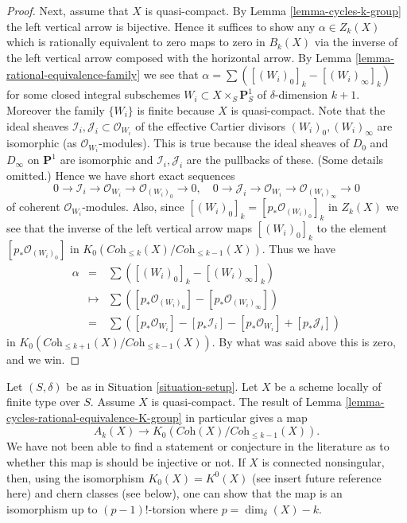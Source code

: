 \begin{proof}
\medskip\noindent
Next, assume that $X$ is quasi-compact. By Lemma \ref{lemma-cycles-k-group}
the left vertical arrow is bijective. Hence it suffices to show
any $\alpha \in Z_k(X)$ which is rationally equivalent to zero
maps to zero in $B_k(X)$ via the inverse of the left vertical
arrow composed with the horizontal arrow.
By Lemma \ref{lemma-rational-equivalence-family} we see that
$\alpha = \sum ([(W_i)_0]_k - [(W_i)_\infty]_k)$ for some
closed integral subschemes $W_i \subset X \times_S \mathbf{P}^1_S$
of $\delta$-dimension $k + 1$. Moreover the family
$\{W_i\}$ is finite because $X$ is quasi-compact.
Note that the ideal sheaves
$\mathcal{I}_i, \mathcal{J}_i \subset \mathcal{O}_{W_i}$
of the effective Cartier divisors $(W_i)_0, (W_i)_\infty$
are isomorphic (as $\mathcal{O}_{W_i}$-modules). This is true
because the ideal sheaves of $D_0$ and $D_\infty$ on $\mathbf{P}^1$
are isomorphic and $\mathcal{I}_i, \mathcal{J}_i$ are the pullbacks of
these. (Some details omitted.) Hence we have
short exact sequences
$$
0 \to \mathcal{I}_i \to \mathcal{O}_{W_i} \to \mathcal{O}_{(W_i)_0} \to 0,
\quad
0 \to \mathcal{J}_i \to \mathcal{O}_{W_i} \to \mathcal{O}_{(W_i)_\infty} \to 0
$$
of coherent $\mathcal{O}_{W_i}$-modules.
Also, since $[(W_i)_0]_k = [p_*\mathcal{O}_{(W_i)_0}]_k$ in
$Z_k(X)$ we see that the inverse of the left vertical arrow
maps $[(W_i)_0]_k$ to the element $[p_*\mathcal{O}_{(W_i)_0}]$ in
$K_0(\textit{Coh}_{\leq k}(X)/\textit{Coh}_{\leq k - 1}(X))$.
Thus we have
\begin{eqnarray*}
\alpha
& = &
\sum \left([(W_i)_0]_k - [(W_i)_\infty]_k\right) \\
& \mapsto &
\sum \left([p_*\mathcal{O}_{(W_i)_0}] - [p_*\mathcal{O}_{(W_i)_\infty}]\right)
\\
& = &
\sum \left([p_*\mathcal{O}_{W_i}] - [p_*\mathcal{I}_i]
- [p_*\mathcal{O}_{W_i}] + [p_*\mathcal{J}_i]\right)
\end{eqnarray*}
in $K_0(\textit{Coh}_{\leq k + 1}(X)/\textit{Coh}_{\leq k - 1}(X))$.
By what was said above this is zero, and we win.
\end{proof}

\begin{remark}
\label{remark-good-cases-K-A}
Let $(S, \delta)$ be as in Situation \ref{situation-setup}.
Let $X$ be a scheme locally of finite type over $S$.
Assume $X$ is quasi-compact.
The result of Lemma \ref{lemma-cycles-rational-equivalence-K-group}
in particular gives a map
$$
A_k(X)
\longrightarrow
K_0(\textit{Coh}(X)/\textit{Coh}_{\leq k - 1}(X)).
$$
We have not been able to find a statement or conjecture in the
literature as to whether this map is should be injective or not.
If $X$ is connected nonsingular, then, using the
isomorphism $K_0(X) = K^0(X)$ (see insert future reference here)
and chern classes (see below), one can show that
the map is an isomorphism up to $(p - 1)!$-torsion where
$p = \dim_\delta(X) - k$.
\end{remark}















